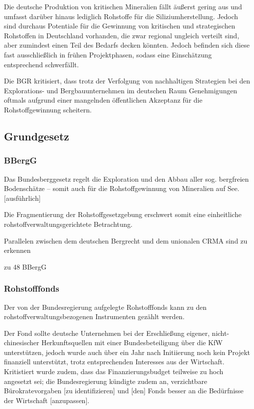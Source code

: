 \documentclass[12pt,a4paper,oneside]{book} %
\begin{document}
Die deutsche Produktion von kritischen Mineralien fällt äußerst gering aus und umfasst darüber hinaus lediglich Rohstoffe für die Siliziumherstellung.\autocite{Commodity TopNews 73, S. 4} Jedoch sind durchaus Potentiale für die Gewinnung von kritischen und strategischen Rohstoffen in Deutschland vorhanden, die zwar regional ungleich verteilt sind, aber zumindest einen Teil des Bedarfs decken könnten. Jedoch befinden sich diese fast ausschließlich in frühen Projektphasen,\autocite{Commodity TopNews 73, S. 10-11} sodass eine Einschätzung entsprechend schwerfällt.

Die BGR kritisiert, dass trotz der Verfolgung von nachhaltigen Strategien bei den Explorations- und Bergbauunternehmen im deutschen Raum Genehmigungen oftmals aufgrund einer mangelnden öffentlichen Akzeptanz für die Rohstoffgewinnung scheitern.\autocite{Commodity TopNews 73, S. 14}

\subsection{Grundgesetz}

\subsubsection{BBergG}
Das Bundesberggesetz regelt die Exploration und den Abbau aller sog. bergfreien Bodenschätze -- somit auch für die Rohstoffgewinnung von Mineralien auf See.[ausführlich]\autocite{Jenisch II}

Die Fragmentierung der Rohstoffgesetzgebung erschwert somit eine einheitliche rohstoffverwaltungsgerichtete Betrachtung.

Parallelen zwischen dem deutschen Bergrecht und dem unionalen CRMA sind zu erkennen

zu 48 BBergG

\subsubsection{Rohstofffonds}
Der von der Bundesregierung aufgelegte Rohstofffonds kann zu den rohstoffverwaltungsbezogenen Instrumenten gezählt werden.

Der Fond sollte deutsche Unternehmen bei der Erschließung eigener, nicht-chinesischer Herkunftsquellen mit einer Bundesbeteiligung über die KfW unterstützen, jedoch wurde auch über ein Jahr nach Initiierung noch kein Projekt finanziell unterstützt, trotz entsprechenden Interesses aus der Wirtschaft. Kritistiert wurde zudem, dass das Finanzierungsbudget teilweise zu hoch angesetzt sei; die Bundesregierung kündigte zudem an, \glqq verzichtbare Bürokratevorgaben [zu identifizieren] und [den] Fonds besser an die Bedürfnisse der Wirtschaft [anzupassen]\grqq.\autocite{Wirtschaft fordert mehr Tempo bei Rohstofffonds}
\end{document}

